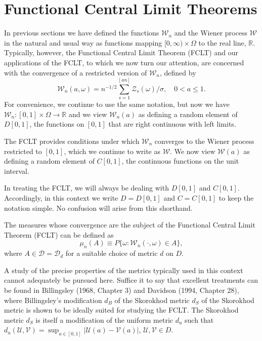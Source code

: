 \section{Functional Central Limit Theorems}\label{sec:fclt}

In previous sections we have defined the functions $\mathcal{W}_n$ and the Wiener process $\mathcal{W}$ in the natural and usual way as functions mapping $[0,\infty) \times \Omega$ to the real line, $\mathbb{R}$. Typically, however, the Functional Central Limit Theorem (FCLT) and our applications of the FCLT, to which we now turn our attention, are concerned with the convergence of a restricted version of $\mathcal{W}_n$, defined by
\[
\mathcal{W}_n(a, \omega) = n^{-1/2}\sum_{s=1}^{[an]} \mathcal{Z}_s(\omega)/\sigma, \quad 0 < a \leq 1.
\]
For convenience, we continue to use the same notation, but now we have $\mathcal{W}_n : [0,1] \times \Omega \to \mathbb{R}$ and we view $\mathcal{W}_n(a)$ as defining a random element of $D[0,1]$, the functions on $[0,1]$ that are right continuous with left limits.

The FCLT provides conditions under which $\mathcal{W}_n$ converges to the Wiener process restricted to $[0,1]$, which we continue to write as $\mathcal{W}$. We now view $\mathcal{W}(a)$ as defining a random element of $C[0,1]$, the continuous functions on the unit interval.

In treating the FCLT, we will always be dealing with $D[0,1]$ and $C[0,1]$. Accordingly, in this context we write $D = D[0,1]$ and $C = C[0,1]$ to keep the notation simple. No confusion will arise from this shorthand.

The measures whose convergence are the subject of the Functional Central Limit Theorem (FCLT) can be defined as
\[
\mu_n(A) \equiv P\{\omega : \mathcal{W}_n(\cdot, \omega) \in A\},
\]
where $A \in \mathcal{D} = \mathcal{D}_d$ for a suitable choice of metric $d$ on $D$.

A study of the precise properties of the metrics typically used in this context cannot adequately be pursued here. Suffice it to say that excellent treatments can be found in Billingsley (1968, Chapter 3) and Davidson (1994, Chapter 28), where Billingsley's modification $d_B$ of the Skorokhod metric $d_S$ of the Skorokhod metric is shown to be ideally suited for studying the FCLT. The Skorokhod metric $d_S$ is itself a modification of the uniform metric $d_u$ such that $d_u(\mathcal{U}, \mathcal{V}) = \sup_{a \in [0,1]} |\mathcal{U}(a) - \mathcal{V}(a)|$, $\mathcal{U}, \mathcal{V} \in D$.


